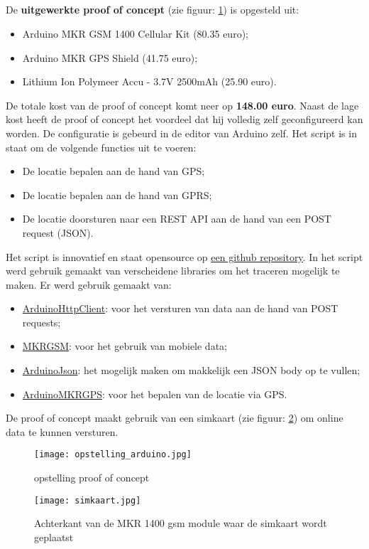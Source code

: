 \subsection{}
De \textbf{uitgewerkte proof of concept} (zie figuur: \ref{fig:opstelling_arduino}) is opgesteld uit:
\begin{itemize}
	\item Arduino MKR GSM 1400 Cellular Kit (80.35 euro);
	\item Arduino MKR GPS Shield (41.75 euro);
	\item Lithium Ion Polymeer Accu - 3.7V 2500mAh (25.90 euro).
\end{itemize}
De totale kost van de proof of concept komt neer op \textbf{148.00 euro}. Naast de lage kost heeft de proof of concept het voordeel dat hij volledig zelf geconfigureerd kan worden. De configuratie is gebeurd in de editor van Arduino zelf. Het script is in staat om de volgende functies uit te voeren:
\begin{itemize}
	\item De locatie bepalen aan de hand van GPS;
	\item De locatie bepalen aan de hand van GPRS;
	\item De locatie doorsturen naar een REST API aan de hand van een POST request (JSON).
\end{itemize}
Het script is innovatief en staat opensource op \underline{\href{https://github.com/IndyVC/bap-arduino}{een github repository}}. In het script werd gebruik gemaakt van verscheidene libraries om het traceren mogelijk te maken.
Er werd gebruik gemaakt van:
\begin{itemize}
	\item \href{https://github.com/arduino-libraries/ArduinoHttpClient}{ArduinoHttpClient}: voor het versturen van data aan de hand van POST requests;
	\item \href{https://github.com/arduino-libraries/MKRGSM}{MKRGSM}: voor het gebruik van mobiele data;
	\item \href{https://github.com/bblanchon/ArduinoJson}{ArduinoJson}: het mogelijk maken om makkelijk een JSON body op te vullen;
	\item \href{https://github.com/arduino-libraries/Arduino_MKRGPS}{ArduinoMKRGPS}: voor het bepalen van de locatie via GPS.
\end{itemize}
De proof of concept maakt gebruik van een simkaart (zie figuur: \ref{fig:simkaart}) om online data te kunnen versturen. 
\begin{figure}
	\texttt{[image: opstelling\_arduino.jpg]}
	\caption{opstelling proof of concept}
	\label{fig:opstelling_arduino}
\end{figure}
\begin{figure}
	\texttt{[image: simkaart.jpg]}
	\caption{Achterkant van de MKR 1400 gsm module waar de simkaart wordt geplaatst}
	\label{fig:simkaart}
\end{figure}
\pagebreak

